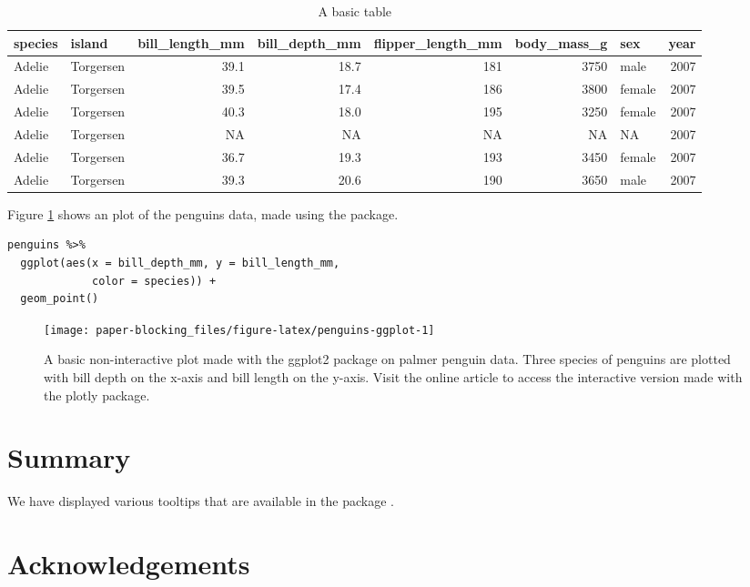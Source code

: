 \begin{table}
\centering
\caption{\label{tab:penguins-tab-static}A basic table}
\centering
\fontsize{7}{9}\selectfont
\begin{tabular}[t]{l|l|r|r|r|r|l|r}
\hline
species & island & bill\_length\_mm & bill\_depth\_mm & flipper\_length\_mm & body\_mass\_g & sex & year\\
\hline
Adelie & Torgersen & 39.1 & 18.7 & 181 & 3750 & male & 2007\\
\hline
Adelie & Torgersen & 39.5 & 17.4 & 186 & 3800 & female & 2007\\
\hline
Adelie & Torgersen & 40.3 & 18.0 & 195 & 3250 & female & 2007\\
\hline
Adelie & Torgersen & NA & NA & NA & NA & NA & 2007\\
\hline
Adelie & Torgersen & 36.7 & 19.3 & 193 & 3450 & female & 2007\\
\hline
Adelie & Torgersen & 39.3 & 20.6 & 190 & 3650 & male & 2007\\
\hline
\end{tabular}
\end{table}

Figure \ref{fig:penguins-ggplot} shows an plot of the penguins data, made using the  package.

\begin{verbatim}
penguins %>% 
  ggplot(aes(x = bill_depth_mm, y = bill_length_mm, 
             color = species)) + 
  geom_point()
\end{verbatim}

\begin{figure}
\texttt{[image: paper-blocking\_files/figure-latex/penguins-ggplot-1]} \caption{A basic non-interactive plot made with the ggplot2 package on palmer penguin data. Three species of penguins are plotted with bill depth on the x-axis and bill length on the y-axis. Visit the online article to access the interactive version made with the plotly package.}\label{fig:penguins-ggplot}
\end{figure}

\section{Summary}\label{summary}

We have displayed various tooltips that are available in the package .

\section{Acknowledgements}\label{acknowledgements}

